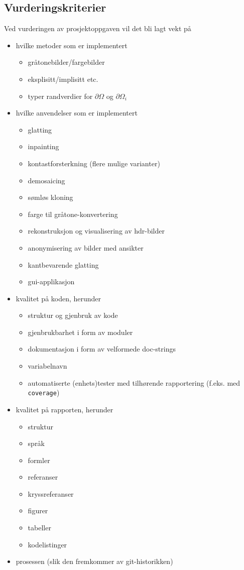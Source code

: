 \documentclass[11pt,a4paper]{article}
\begin{document}
\subsection{Vurderingskriterier}

Ved vurderingen av prosjektoppgaven vil det bli lagt vekt på
\begin{itemize}[noitemsep]
\item hvilke metoder som er implementert
  \begin{itemize}[noitemsep]
  \item gråtonebilder/fargebilder
  \item eksplisitt/implisitt etc.
  \item typer randverdier for $\partial\Omega$ og $\partial\Omega_i$
  \end{itemize}
\item hvilke anvendelser som er implementert
  \begin{itemize}[noitemsep]
  \item glatting
  \item inpainting
  \item kontastforsterkning (flere mulige varianter)
  \item demosaicing
  \item sømløs kloning
  \item farge til gråtone-konvertering
  \item rekonstruksjon og visualisering av hdr-bilder 
  \item anonymisering av bilder med ansikter
  \item kantbevarende glatting
  \item gui-applikasjon
  \end{itemize}
\item kvalitet på koden, herunder
  \begin{itemize}[noitemsep]
  \item struktur og gjenbruk av kode
  \item gjenbrukbarhet i form av moduler
  \item dokumentasjon i form av velformede doc-strings
  \item variabelnavn
  \item automatiserte (enhets)tester med tilhørende rapportering (f.eks. med \texttt{coverage})
  \end{itemize}
\item kvalitet på rapporten, herunder
  \begin{itemize}[noitemsep]
  \item struktur
  \item språk
  \item formler
  \item referanser
  \item kryssreferanser
  \item figurer
  \item tabeller
  \item kodelistinger
  \end{itemize}
\item prosessen (slik den fremkommer av git-historikken)
\end{itemize}
\end{document}
